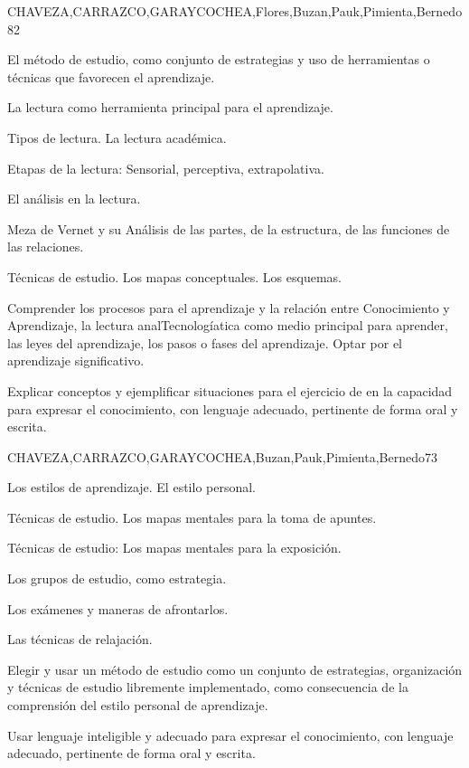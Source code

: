 \begin{syllabus}
\begin{unit}{}{CHAVEZA,CARRAZCO,GARAYCOCHEA,Flores,Buzan,Pauk,Pimienta,Bernedo}{8}{2}
\begin{topics}
        \item El método de estudio, como conjunto de estrategias y uso de herramientas o técnicas que favorecen el aprendizaje.
        \item La lectura como herramienta principal para el aprendizaje.
        \item Tipos de lectura. La lectura académica.
        \item Etapas de la lectura: Sensorial, perceptiva, extrapolativa.
        \item El análisis en la lectura.
        \item Meza de Vernet y su Análisis de las partes, de la estructura, de las funciones de las relaciones.
        \item Técnicas de estudio. Los mapas conceptuales. Los esquemas.
\end{topics}
\begin{unitgoals}
        \item Comprender los procesos para el aprendizaje y la relación entre Conocimiento y Aprendizaje, la  lectura analTecnologíatica como medio principal para aprender, las leyes del aprendizaje, los pasos o fases del aprendizaje. Optar por el aprendizaje  significativo.
        \item Explicar conceptos y ejemplificar situaciones  para el ejercicio de en la capacidad para expresar el conocimiento, con lenguaje adecuado, pertinente de forma oral y escrita.
\end{unitgoals}
\end{unit}

\begin{unit}{}{CHAVEZA,CARRAZCO,GARAYCOCHEA,Buzan,Pauk,Pimienta,Bernedo}{7}{3}
\begin{topics}
        \item Los estilos de aprendizaje. El estilo personal.
        \item Técnicas de estudio. Los mapas mentales para la toma de apuntes.
        \item Técnicas de estudio: Los mapas mentales para la exposición.
        \item Los grupos de estudio, como estrategia.
        \item Los exámenes y maneras de afrontarlos.
        \item Las técnicas de relajación.
\end{topics}
\begin{unitgoals}
        \item Elegir y usar un método de estudio como un conjunto de estrategias, organización  y técnicas de estudio libremente implementado, como consecuencia  de la comprensión del estilo personal de aprendizaje.
        \item Usar lenguaje inteligible y adecuado para expresar el conocimiento, con lenguaje adecuado, pertinente de forma oral y escrita.
\end{unitgoals}
\end{unit}




\end{syllabus}
